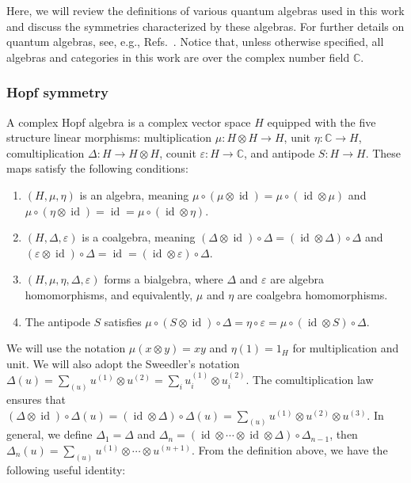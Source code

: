 \documentclass[a4paper,11pt]{article}
\theoremstyle{theorem}
\theoremstyle{remark}
\newcommand{\id}{\operatorname{id}}
\begin{document}
Here, we will review the definitions of various quantum algebras used in this work and discuss the symmetries characterized by these algebras. For further details on quantum algebras, see, e.g., Refs.~\cite{majid2000foundations,abe2004hopf,montgomery1993hopf,kassel2012quantum}.
Notice that, unless otherwise specified, all algebras and categories in this work are over the complex number field \(\mathbb{C}\).


\subsubsection{Hopf symmetry}
A complex Hopf algebra is a complex vector space $H$ equipped with the five structure linear morphisms: multiplication $\mu: H \otimes H \to H$, unit $\eta: \mathbb{C} \to H$, comultiplication $\Delta: H \to H \otimes H$, counit $\varepsilon: H \to \mathbb{C}$, and antipode $S: H \to H$. These maps satisfy the following conditions:
    \begin{enumerate}
        \item $(H, \mu, \eta)$ is an algebra, meaning $\mu \circ (\mu \otimes \id) = \mu \circ (\id \otimes \mu)$ and $\mu \circ (\eta \otimes \id) = \id = \mu \circ (\id \otimes \eta)$.
        
        \item $(H, \Delta, \varepsilon)$ is a coalgebra, meaning $(\Delta \otimes \id) \circ \Delta = (\id \otimes \Delta) \circ \Delta$ and $(\varepsilon \otimes \id) \circ \Delta = \id = (\id \otimes \varepsilon) \circ \Delta$.
        
        \item $(H, \mu, \eta, \Delta, \varepsilon)$ forms a bialgebra, where $\Delta$ and $\varepsilon$ are algebra homomorphisms, and equivalently, $\mu$ and $\eta$ are coalgebra homomorphisms.
        
        \item The antipode $S$ satisfies $\mu \circ (S \otimes \id) \circ \Delta = \eta \circ \varepsilon = \mu \circ (\id \otimes S) \circ \Delta$.
    \end{enumerate}
We will use the notation $\mu(x \otimes y) = xy$ and $\eta(1) = 1_H$ for multiplication and unit. We will also adopt the Sweedler's notation $\Delta(u) = \sum_{(u)} u^{(1)} \otimes u^{(2)} = \sum_{i} u_i^{(1)} \otimes u_i^{(2)}$. The comultiplication law ensures that $(\Delta \otimes \id) \circ \Delta(u) = (\id \otimes \Delta) \circ \Delta(u) = \sum_{(u)} u^{(1)} \otimes u^{(2)} \otimes u^{(3)}$. 
In general, we define $\Delta_1 = \Delta$ and $\Delta_n = (\id \otimes \cdots \otimes \id \otimes \Delta) \circ \Delta_{n-1}$, then $\Delta_n(u) = \sum_{(u)} u^{(1)} \otimes \cdots \otimes u^{(n+1)}$. From the definition above, we have the following useful identity:
\end{document}
